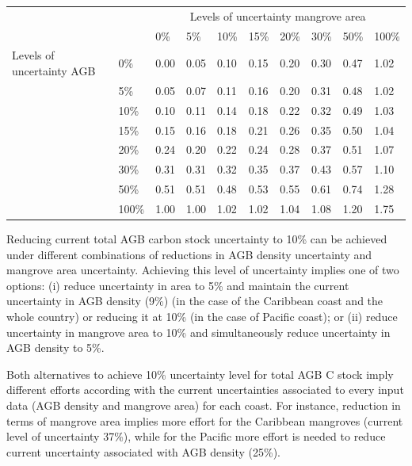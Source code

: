 \documentclass[review, authoryear]{elsarticle}   	%
\begin{document}
\begin{table}[htbp]
   \centering
   \begin{tabular}{p{2.0cm}p{1.0cm}p{1.0cm}p{1.0cm}p{1.0cm}p{1.0cm}p{1.0cm}p{1.0cm}p{1.0cm}p{1.0cm}} %
      \toprule
        &&\multicolumn{8}{c}{Levels of uncertainty mangrove area}\\      
      &&0\%&5\%&10\%&15\%&20\%&30\%&50\%&100\%\\
            \midrule 
Levels of uncertainty AGB&0\%&0.00&0.05&0.10&0.15&0.20&0.30&0.47&1.02\\ 
      &5\%&0.05&0.07&0.11&0.16&0.20&0.31&0.48&1.02\\
     &10\%&0.10&0.11&0.14&0.18&0.22&0.32&0.49&1.03\\
      &15\%&0.15&0.16&0.18&0.21&0.26&0.35&0.50&1.04\\
      &20\%&0.24&0.20&0.22&0.24&0.28&0.37&0.51&1.07\\
     &30\%&0.31&0.31&0.32&0.35&0.37&0.43&0.57&1.10\\
 &50\%&0.51&0.51&0.48&0.53&0.55&0.61&0.74&1.28\\
     &100\%&1.00&1.00&1.02&1.02&1.04&1.08&1.20&1.75\\
                    \bottomrule
   \end{tabular}
   \label{tab:sensCol}
\end{table}

Reducing current total AGB carbon stock uncertainty to 10\% can be achieved under different combinations of reductions in AGB density uncertainty and mangrove area uncertainty. Achieving  this level of uncertainty implies one of two options: (i) reduce uncertainty in area to 5\% and maintain the current uncertainty in AGB density (9\%) (in the case of the Caribbean coast and the whole country) or reducing it at 10\% (in the case of Pacific coast); or (ii) reduce uncertainty in mangrove area to 10\% and simultaneously reduce uncertainty in AGB density to 5\%. 

Both alternatives to achieve 10\% uncertainty level for total AGB C stock imply different efforts according with the current uncertainties associated to every input data (AGB density and mangrove area) for each coast. For instance, reduction in terms of mangrove area implies more effort for the Caribbean mangroves (current level of uncertainty 37\%), while for the Pacific more effort is needed to reduce  current uncertainty associated with AGB density (25\%). 
\end{document}
